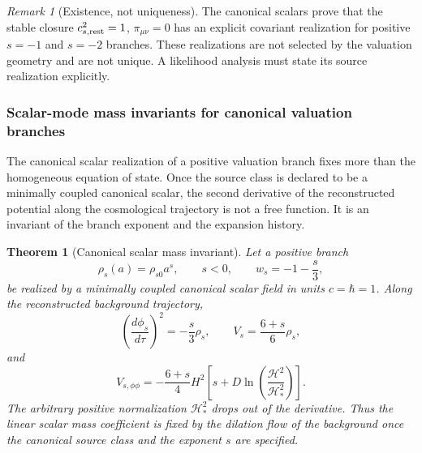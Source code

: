 \documentclass[11pt,a4paper]{article}
\def\dd{d}%
\def\Dil{D}%
\numberwithin{equation}{section}
\theoremstyle{definition}
\theoremstyle{plain}
\newtheorem{theorem}[criterion]{Theorem}
\theoremstyle{remark}
\newtheorem{remark}[criterion]{Remark}
\newcommand{\Dil}{\mathscr{D}}
\newcommand{\dd}{\mathrm{d}}
\begin{document}
\begin{remark}[Existence, not uniqueness]
The canonical scalars prove that the stable closure \(c_{s,\rm rest}^2=1\), \(\pi_{\mu\nu}=0\) has an explicit covariant realization for positive \(s=-1\) and \(s=-2\) branches. These realizations are not selected by the valuation geometry and are not unique. A likelihood analysis must state its source realization explicitly.
\end{remark}


\subsubsection{Scalar-mode mass invariants for canonical valuation branches}
\label{sec:scalar-mode-mass-invariants}

The canonical scalar realization of a positive valuation branch fixes more than the homogeneous equation of state.  Once the source class is declared to be a minimally coupled canonical scalar, the second derivative of the reconstructed potential along the cosmological trajectory is not a free function.  It is an invariant of the branch exponent and the expansion history.

\begin{theorem}[Canonical scalar mass invariant]
\label{thm:canonical-mass-invariant-general}
Let a positive branch
\begin{equation}
\rho_s(a)=\rho_{s0}a^s,
\qquad s<0,
\qquad
w_s=-1-\frac{s}{3},
\end{equation}
be realized by a minimally coupled canonical scalar field in units \(c=\hbar=1\).  Along the reconstructed background trajectory,
\begin{equation}
\left(\frac{\dd\phi_s}{\dd\tau}\right)^2
=-\frac{s}{3}\rho_s,
\qquad
V_s=\frac{6+s}{6}\rho_s,
\end{equation}
and
\begin{equation}
\boxed{
V_{s,\phi\phi}
=
-\frac{6+s}{4}H^2
\left[
 s+\Dil\ln\left(\frac{\mathcal H^2}{\mathcal H_*^2}\right)
\right].
}
\label{eq:general-mass-invariant}
\end{equation}
The arbitrary positive normalization \(\mathcal H_*^2\) drops out of the derivative.  Thus the linear scalar mass coefficient is fixed by the dilation flow of the background once the canonical source class and the exponent \(s\) are specified.
\end{theorem}
\end{document}
